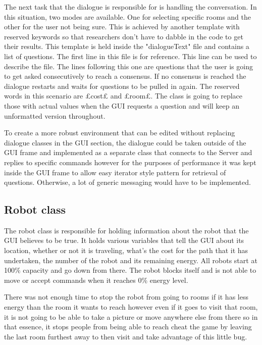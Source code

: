       The next task that the dialogue is responsible for is handling the conversation. In this situation, two modes are available. One for selecting specific rooms and the other for the user not being sure. This is achieved by another template with reserved keywords so that researchers don't have to dabble in the code to get their results. This template is held inside the "dialogueText" file and contains a list of questions. The first line in this file is for reference. This line can be used to describe the file. The lines following this one are questions that the user is going to get asked consecutively to reach a consensus. If no consensus is reached the dialogue restarts and waits for questions to be pulled in again. The reserved words in this scenario are £cost£ and £room£. The class is going to replace those with actual values when the GUI requests a question and will keep an unformatted version throughout.

      To create a more robust environment that can be edited without replacing dialogue classes in the GUI section, the dialogue could be taken outside of the GUI frame and implemented as a separate class that connects to the Server and replies to specific commands however for the purposes of performance it was kept inside the GUI frame to allow easy iterator style pattern for retrieval of questions. Otherwise, a lot of generic messaging would have to be implemented.

    \subsection{Robot class}
      The robot class is responsible for holding information about the robot that the GUI believes to be true. It holds various variables that tell the GUI about its location, whether or not it is traveling, what's the cost for the path that it has undertaken, the number of the robot and its remaining energy. All robots start at 100\% capacity and go down from there. The robot blocks itself and is not able to move or accept commands when it reaches 0\% energy level.

      There was not enough time to stop the robot from going to rooms if it has less energy than the room it wants to reach however even if it goes to visit that room, it is not going to be able to take a picture or move anywhere else from there so in that essence, it stops people from being able to reach cheat the game by leaving the last room furthest away to then visit and take advantage of this little bug.

